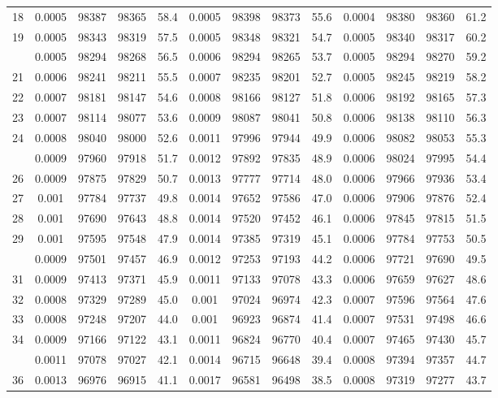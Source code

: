 \documentclass[
  14pt,
]{article}
\begin{document}
\begin{longtable}[t]{lcccccccccccc}
18 & 0.0005 & 98387 & 98365 & 58.4 & 0.0005 & 98398 & 98373 & 55.6 & 0.0004 & 98380 & 98360 & 61.2\\
19 & 0.0005 & 98343 & 98319 & 57.5 & 0.0005 & 98348 & 98321 & 54.7 & 0.0005 & 98340 & 98317 & 60.2\\
\addlinespace
20 & 0.0005 & 98294 & 98268 & 56.5 & 0.0006 & 98294 & 98265 & 53.7 & 0.0005 & 98294 & 98270 & 59.2\\
21 & 0.0006 & 98241 & 98211 & 55.5 & 0.0007 & 98235 & 98201 & 52.7 & 0.0005 & 98245 & 98219 & 58.2\\
22 & 0.0007 & 98181 & 98147 & 54.6 & 0.0008 & 98166 & 98127 & 51.8 & 0.0006 & 98192 & 98165 & 57.3\\
23 & 0.0007 & 98114 & 98077 & 53.6 & 0.0009 & 98087 & 98041 & 50.8 & 0.0006 & 98138 & 98110 & 56.3\\
24 & 0.0008 & 98040 & 98000 & 52.6 & 0.0011 & 97996 & 97944 & 49.9 & 0.0006 & 98082 & 98053 & 55.3\\
\addlinespace
25 & 0.0009 & 97960 & 97918 & 51.7 & 0.0012 & 97892 & 97835 & 48.9 & 0.0006 & 98024 & 97995 & 54.4\\
26 & 0.0009 & 97875 & 97829 & 50.7 & 0.0013 & 97777 & 97714 & 48.0 & 0.0006 & 97966 & 97936 & 53.4\\
27 & 0.001 & 97784 & 97737 & 49.8 & 0.0014 & 97652 & 97586 & 47.0 & 0.0006 & 97906 & 97876 & 52.4\\
28 & 0.001 & 97690 & 97643 & 48.8 & 0.0014 & 97520 & 97452 & 46.1 & 0.0006 & 97845 & 97815 & 51.5\\
29 & 0.001 & 97595 & 97548 & 47.9 & 0.0014 & 97385 & 97319 & 45.1 & 0.0006 & 97784 & 97753 & 50.5\\
\addlinespace
30 & 0.0009 & 97501 & 97457 & 46.9 & 0.0012 & 97253 & 97193 & 44.2 & 0.0006 & 97721 & 97690 & 49.5\\
31 & 0.0009 & 97413 & 97371 & 45.9 & 0.0011 & 97133 & 97078 & 43.3 & 0.0006 & 97659 & 97627 & 48.6\\
32 & 0.0008 & 97329 & 97289 & 45.0 & 0.001 & 97024 & 96974 & 42.3 & 0.0007 & 97596 & 97564 & 47.6\\
33 & 0.0008 & 97248 & 97207 & 44.0 & 0.001 & 96923 & 96874 & 41.4 & 0.0007 & 97531 & 97498 & 46.6\\
34 & 0.0009 & 97166 & 97122 & 43.1 & 0.0011 & 96824 & 96770 & 40.4 & 0.0007 & 97465 & 97430 & 45.7\\
\addlinespace
35 & 0.0011 & 97078 & 97027 & 42.1 & 0.0014 & 96715 & 96648 & 39.4 & 0.0008 & 97394 & 97357 & 44.7\\
36 & 0.0013 & 96976 & 96915 & 41.1 & 0.0017 & 96581 & 96498 & 38.5 & 0.0008 & 97319 & 97277 & 43.7\\

\end{longtable}
\end{document}
